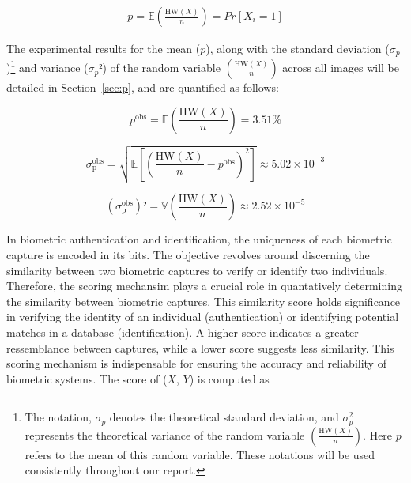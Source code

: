 \begin{equation} \label{eq:p}
    \begin{aligned}
        p = \mathbb{E}\left( \frac{\text{HW}(X)}{n} \right) = Pr\left[X_i = 1\right]
    \end{aligned}
\end{equation}

The experimental results for the mean (\(p\)), along with the standard deviation (\(\sigma_p\))\footnote{The notation, \( \sigma_{p}\) denotes the theoretical standard deviation, and \(\sigma^2_p \) represents the theoretical variance of the random variable \(\left( \frac{\text{HW}(X)}{n} \right)\). Here $p$ refers to the mean of this random variable. These notations will be used consistently throughout our report.} and variance (\(\sigma_{p}²\)) of the random variable \(\left( \frac{\text{HW}(X)}{n} \right)\) across all images will be detailed in Section~\ref{sec:p}, and are quantified as follows:

\begin{equation} \label{eq:proba1}
    p^{\text{obs}} = \mathbb{E}\left( \frac{\text{HW}(X)}{n} \right) = 3.51\%
\end{equation}


\begin{equation} \label{eq:proba2}
    \sigma_{\text{p}}^{\text{obs}} = \sqrt{\mathbb{E} \left[ \left( \frac{\text{HW}(X)}{n} - p^{\text{obs}} \right)^2 \right]} \approx 5.02 \times 10^{-3}
\end{equation}

\begin{equation} \label{eq:proba3}
    (\sigma_{\text{p}}^{\text{obs}})² = \mathbb{V}\left( \frac{\text{HW}(X)}{n} \right)  \approx 2.52 \times 10^{-5}
\end{equation}

In biometric authentication and identification, the uniqueness of each biometric capture is encoded in its bits. The objective revolves around discerning the similarity between two biometric captures to verify or identify two individuals. Therefore, the scoring mechansim plays a crucial role in quantatively determining the similarity between biometric captures. This similarity score holds significance in verifying the identity of an individual (authentication) or identifying potential matches in a database (identification). A higher score indicates a greater ressemblance between captures, while a lower score suggests less similarity. This scoring mechanism is indispensable for ensuring the accuracy and reliability of biometric systems. The score of (\(X\), \(Y\)) is computed as

